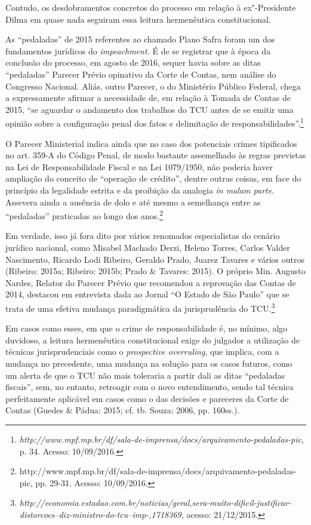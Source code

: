 Contudo, os desdobramentos concretos do processo em relação à
ex"-Presidente Dilma em quase nada seguiram essa leitura hermenêutica
constitucional.

As ``pedaladas'' de 2015 referentes ao chamado Plano Safra foram um dos
fundamentos jurídicos do \emph{impeachment.} É de se registrar que à
época da conclusão do processo, em agosto de 2016, sequer havia sobre as
ditas ``pedaladas'' Parecer Prévio opinativo da Corte de Contas, nem
análise do Congresso Nacional. Aliás, outro Parecer, o do Ministério
Público Federal, chega a expressamente afirmar a necessidade de, em
relação à Tomada de Contas de 2015, ``se aguardar o andamento dos
trabalhos do TCU antes de se emitir uma opinião sobre a configuração
penal dos fatos e delimitação de responsabilidades''.\footnote{\emph{http://www.mpf.mp.br/df/sala-de-imprensa/docs/arquivamento-pedaladas-pic},
  p. 34. Acesso: 10/09/2016.}

O Parecer Ministerial indica ainda que no caso dos potenciais crimes
tipificados no art. 359-A do Código Penal, de modo bastante assemelhado
às regras previstas na Lei de Responsabilidade Fiscal e na Lei
1079/1950, não poderia haver ampliação do conceito de ``operação de
crédito'', dentre outras coisas, em face do princípio da legalidade
estrita e da proibição da analogia \emph{in malam parte}. Assevera ainda
a ausência de dolo e até mesmo a semelhança entre as ``pedaladas''
praticadas ao longo dos anos.\footnote{http://www.mpf.mp.br/df/sala-de-imprensa/docs/arquivamento-pedaladas-pic,
  pp. 29-31. Acesso: 10/09/2016.}

Em verdade, isso já fora dito por vários renomados especialistas do
cenário jurídico nacional, como Misabel Machado Derzi, Heleno Torres,
Carlos Valder Nascimento, Ricardo Lodi Ribeiro, Geraldo Prado, Juarez
Tavares e vários outros (Ribeiro: 2015a; Ribeiro: 2015b; Prado \&
Tavares: 2015). O próprio Min. Augusto Nardes, Relator do Parecer Prévio
que recomendou a reprovação das Contas de 2014, destacou em entrevista
dada ao Jornal ``O Estado de São Paulo'' que se trata de uma efetiva
mudança paradigmática da jurisprudência do TCU.\footnote{\emph{http://economia.estadao.com.br/noticias/geral,sera-muito-dificil-justificar-distorcoes--diz-ministro-do-tcu--imp-,1718369},
  acesso: 21/12/2015.}

Em casos como esses, em que o crime de responsabilidade é, no mínimo,
algo duvidoso, a leitura hermenêutica constitucional exige do julgador a
utilização de técnicas jurisprudenciais como o \emph{prospective
overruling}, que implica, com a mudança no precedente, uma mudança na
solução para os casos futuros, como um alerta de que o TCU não mais
toleraria a partir dali as ditas ``pedaladas fiscais'', sem, no entanto,
retroagir com o novo entendimento, sendo tal técnica perfeitamente
aplicável em casos como o das decisões e pareceres da Corte de Contas
(Guedes \& Pádua: 2015; cf. tb. Souza: 2006, pp. 160ss.).

